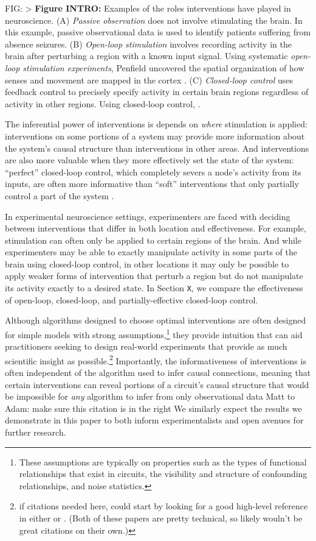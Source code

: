 FIG: %
\textgreater{} \textbf{Figure INTRO:} Examples of the roles
interventions have played in neuroscience. (A) \emph{Passive
observation} does not involve stimulating the brain. In this example,
passive observational data is used to identify patients suffering from
absence seizures. (B) \emph{Open-loop stimulation} involves recording
activity in the brain after perturbing a region with a known input
signal. Using systematic \emph{open-loop stimulation experiments},
Penfield uncovered the spatial organization of how senses and movement
are mapped in the cortex . (C) \emph{Closed-loop control} uses feedback
control to precisely specify activity in certain brain regions
regardless of activity in other regions. Using closed-loop control, .

The inferential power of interventions is depends on \emph{where}
stimulation is applied: interventions on some portions of a system may
provide more information about the system's causal structure than
interventions in other areas. And interventions are also more valuable
when they more effectively set the state of the system: ``perfect''
closed-loop control, which completely severs a node's activity from its
inputs, are often more informative than ``soft'' interventions that only
partially control a part of the system .

In experimental neuroscience settings, experimenters are faced with
deciding between interventions that differ in both location and
effectiveness. For example, stimulation can often only be applied to
certain regions of the brain. And while experimenters may be able to
exactly manipulate activity in some parts of the brain using closed-loop
control, in other locations it may only be possible to apply weaker
forms of intervention that perturb a region but do not manipulate its
activity exactly to a desired state. In Section \texttt{X}, we compare
the effectiveness of open-loop, closed-loop, and partially-effective
closed-loop control.

Although algorithms designed to choose optimal interventions are often
designed for simple models with strong assumptions,\footnote{These
  assumptions are typically on properties such as the types of
  functional relationships that exist in circuits, the visibility and
  structure of confounding relationships, and noise statistics.} they
provide intuition that can aid practitioners seeking to design
real-world experiments that provide as much scientific insight as
possible.\footnote{if citations needed here, could start by looking for
  a good high-level reference in either or . (Both of these papers are
  pretty technical, so likely wouln't be great citations on their own.)}
Importantly, the informativeness of interventions is often independent
of the algorithm used to infer causal connections, meaning that certain
interventions can reveal portions of a circuit's causal structure that
would be impossible for \emph{any} algorithm to infer from only
observational data Matt to Adam: make sure this citation is in the right
We similarly expect the results we demonstrate in this paper to both
inform experimentalists and open avenues for further research.

